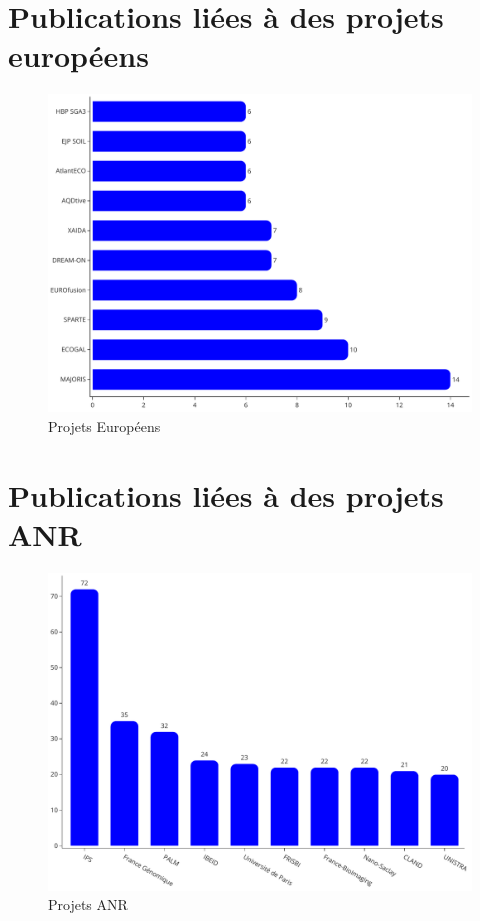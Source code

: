 \documentclass[french, 11pt]{dibiso/biso}
\begin{document}






\pagebreak

\section{Publications liées à des projets européens}

\begin{figure}[!h]
  \includegraphics[width=.8\textwidth]{figures/european_projects.pdf}
  \centering
  \caption{Projets Européens}
  \label{fig_eu_projects}
\end{figure}








\section{Publications liées à des projets ANR}

\begin{figure}[!h]
  \includegraphics[width=.8\textwidth]{figures/anr_projects.pdf}
  \centering
  \caption{Projets ANR}
  \label{fig_anr_projects}
\end{figure}
\end{document}
